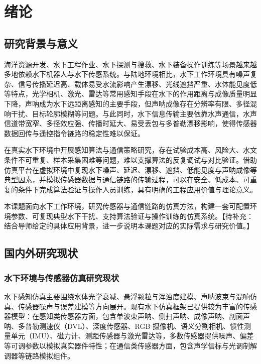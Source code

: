 
\chapter{绪论}

\section{研究背景与意义}

海洋资源开发、水下工程作业、水下探测与搜救、水下装备操作训练等场景越来越多地依赖水下机器人与水下传感系统。与陆地环境相比，水下工作环境具有噪声复杂、信号传播延迟高、载体易受水流影响产生漂移、光线遮挡严重、水体能见度低等特点，光学相机、激光、雷达等常用感知手段在水下的作用距离与成像质量明显下降，声呐成为水下远距离感知的主要手段，但声呐成像存在分辨率有限、多径混响干扰、目标轮廓模糊等问题\cite{ref1}。与此同时，水下信息传输主要依靠水声通信，水声信道带宽窄、多径效应强、传播时延大、易受丢包与多普勒漂移影响，使得传感器数据回传与遥控指令链路的稳定性难以保证\cite{ref2}。

在真实水下环境中开展感知算法与通信策略研究，存在试验成本高、风险大、水文条件不可重复、样本采集困难等问题，难以支撑算法的反复调试与对比验证。借助仿真平台在虚拟环境中复现水下噪声、延迟、漂移、遮挡、低能见度与声呐成像等典型因素，并模拟传感器数据与通信链路的传输过程，可以在安全、低成本、可重复的条件下完成算法验证与操作人员训练，具有明确的工程应用价值与理论意义\cite{ref3}。

本课题面向水下工作环境，研究传感器与通信链路的仿真方法，构建一套可配置环境参数、可复现典型水下干扰、支持算法验证与操作训练的仿真系统。【待补充：结合导师给定的具体应用背景，进一步说明本课题对应的实际需求与研究价值。】

\section{国内外研究现状}

\subsection{水下环境与传感器仿真研究现状}

水下感知仿真主要围绕水体光学衰减、悬浮颗粒与浑浊度建模、声呐波束与混响仿真、传感器噪声与误差建模等方向展开。现有水下仿真框架已提供较为丰富的传感器模型：在感知类传感器方面，包含单波束声呐、侧扫声呐、成像声呐、剖面声呐、多普勒测速仪（DVL）、深度传感器、RGB 摄像机、语义分割相机、惯性测量单元（IMU）、磁力计、测距传感器与激光雷达等，多数传感器提供噪声、偏差等可调参数以模拟真实器件特性；在通信类传感器方面，包含声学信标与光调制解调器等链路模拟组件\cite{ref1}。

